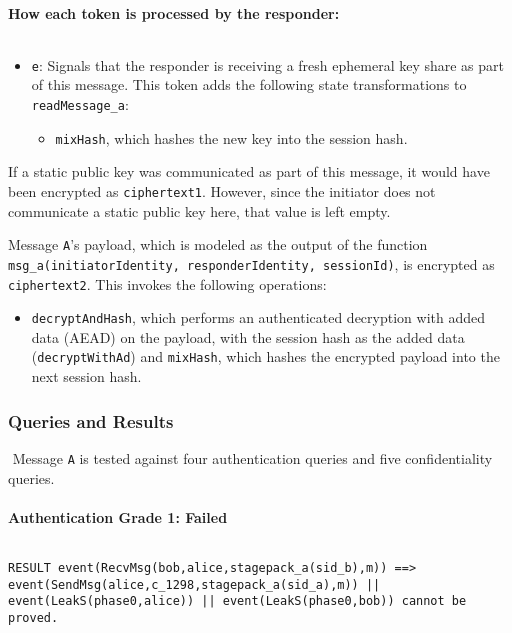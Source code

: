 \paragraph{How each token is processed by the responder:}$ $

\begin{itemize}

\item \texttt{e}: Signals that the responder is receiving a fresh ephemeral key share as part of this message. This token adds the following state transformations to \texttt{readMessage\_a}:
\begin{itemize}

\item \texttt{mixHash}, which hashes the new key into the session hash.
\end{itemize}


\end{itemize}
If a static public key was communicated as part of this message, it would have been encrypted as \texttt{ciphertext1}. However, since the initiator does not communicate a static public key here, that value is left empty.


Message \texttt{A}'s payload, which is modeled as the output of the function \texttt{msg\_a(initiatorIdentity, responderIdentity, sessionId)}, is encrypted as \texttt{ciphertext2}. This invokes the following operations:


\begin{itemize}

\item \texttt{decryptAndHash}, which performs an authenticated decryption with added data (AEAD) on the payload, with the session hash as the added data (\texttt{decryptWithAd}) and \texttt{mixHash}, which hashes the encrypted payload into the next session hash.

\end{itemize}
\subsubsection{Queries and Results}$ $
Message \texttt{A} is tested against four authentication queries and five confidentiality queries.
\paragraph{Authentication Grade 1: Failed}$ $
\begin{lstlisting}
RESULT event(RecvMsg(bob,alice,stagepack_a(sid_b),m)) ==> event(SendMsg(alice,c_1298,stagepack_a(sid_a),m)) || event(LeakS(phase0,alice)) || event(LeakS(phase0,bob)) cannot be proved.
\end{lstlisting}

